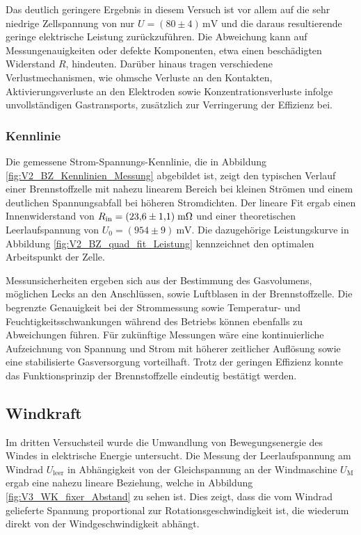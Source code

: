 \documentclass{article}
\begin{document}
\noindent Das deutlich geringere Ergebnis in diesem Versuch ist vor allem auf die sehr niedrige Zellspannung von nur \(U = (80 \pm 4)\,\text{mV}\) und die daraus resultierende geringe elektrische Leistung zurückzuführen. Die Abweichung kann auf Messungenauigkeiten oder defekte Komponenten, etwa einen beschädigten Widerstand \(R\), hindeuten.
Darüber hinaus tragen verschiedene Verlustmechanismen, wie ohmsche Verluste an den Kontakten, Aktivierungsverluste an den Elektroden sowie Konzentrationsverluste infolge unvollständigen Gastransports, zusätzlich zur Verringerung der Effizienz bei.

\subsubsection{Kennlinie}
\noindent Die gemessene Strom-Spannungs-Kennlinie, die in Abbildung \ref{fig:V2_BZ_Kennlinien_Messung} abgebildet ist, zeigt den typischen Verlauf einer Brennstoffzelle mit nahezu linearem Bereich bei kleinen Strömen und einem deutlichen Spannungsabfall bei höheren Stromdichten. Der lineare Fit ergab einen Innenwiderstand von $R_\text{in} = (23{,}6 \pm 1{,}1)\; \text{m}\ohm$ und einer theoretischen Leerlaufspannung von $U_0 = (954 \pm 9) \ \text{mV}$. Die dazugehörige Leistungskurve in Abbildung \ref{fig:V2_BZ_quad_fit_Leistung} kennzeichnet den optimalen Arbeitspunkt der Zelle.
\vspace{2mm}

\noindent Messunsicherheiten ergeben sich aus der Bestimmung des Gasvolumens, möglichen Lecks an den Anschlüssen, sowie Luftblasen in der Brennstoffzelle. Die begrenzte Genauigkeit bei der Strommessung sowie Temperatur- und Feuchtigkeitsschwankungen während des Betriebs können ebenfalls zu Abweichungen führen. Für zukünftige Messungen wäre eine kontinuierliche Aufzeichnung von Spannung und Strom mit höherer zeitlicher Auflösung sowie eine stabilisierte Gasversorgung vorteilhaft. Trotz der geringen Effizienz konnte das Funktionsprinzip der Brennstoffzelle eindeutig bestätigt werden.

\subsection{Windkraft}
\noindent Im dritten Versuchsteil wurde die Umwandlung von Bewegungsenergie des Windes in elektrische Energie untersucht. Die Messung der Leerlaufspannung am Windrad $U_\text{leer}$ in Abhängigkeit von der Gleichspannung an der Windmaschine $U_\text{M}$ ergab eine nahezu lineare Beziehung, welche in Abbildung \ref{fig:V3_WK_fixer_Abstand} zu sehen ist. Dies zeigt, dass die vom Windrad gelieferte Spannung proportional zur Rotationsgeschwindigkeit ist, die wiederum direkt von der Windgeschwindigkeit abhängt.
\vspace{2mm}
\end{document}
